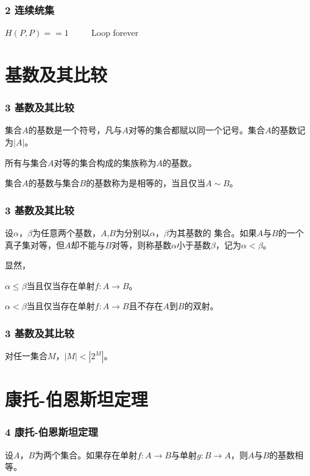 \documentclass{beamer}
\begin{document}
\begin{CJK*}{UTF8}{gbsn}
\begin{frame}
  \frametitle{2 连续统集}
    \begin{codebox}
    \li \If $H(P,P) == 1$ 
    \li  $\quad\quad$\Return
    \li \ElseNoIf Loop forever
    \End
  \end{codebox}  
\end{frame}

\section{基数及其比较}
\begin{frame}
  \frametitle{3 基数及其比较}
  \begin{Def}
    集合$A$的基数是一个符号，凡与$A$对等的集合都赋以同一个记号。集合$A$的基数记为$|A|$。
  \end{Def}
  \begin{Def}
    所有与集合$A$对等的集合构成的集族称为$A$的基数。
  \end{Def}
    \begin{Def}
    集合$A$的基数与集合$B$的基数称为是相等的，当且仅当$A \sim B$。
  \end{Def}
\end{frame}

\begin{frame}
  \frametitle{3 基数及其比较}
  \begin{Def}
    设$\alpha$，$\beta$为任意两个基数，$A$,$B$为分别以$\alpha$，$\beta$为其基数的
    集合。如果$A$与$B$的一个真子集对等，但$A$却不能与$B$对等，则称基数$\alpha$小于基数$\beta$，记为$\alpha < \beta$。
  \end{Def}\pause
  显然，

  $\alpha \leq \beta$当且仅当存在单射$f:A \to B$。

  $\alpha < \beta$当且仅当存在单射$f:A \to B$且不存在$A$到$B$的双射。
\end{frame}

\begin{frame}
  \frametitle{3 基数及其比较}
  \begin{Thm}[康托]
    对任一集合$M$，$|M| < |2^{M}|$。
  \end{Thm}
\end{frame}

\section{康托-伯恩斯坦定理}
\begin{frame}
  \frametitle{4 康托-伯恩斯坦定理}
  \begin{Thm}[康托-伯恩斯坦]
    设$A$，$B$为两个集合。如果存在单射$f:A\to B$与单射$g:B\to A$，则$A$与$B$的基数相等。
  \end{Thm}
\end{frame}



\end{CJK*}
\end{document}
